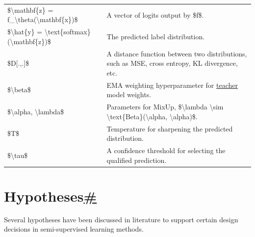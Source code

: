 \begin{longtable}[]{@{}ll@{}}
\$\textbackslash mathbf\{z\} = f\_\textbackslash theta(\textbackslash mathbf\{x\})\$ & A vector of logits output by \$f\$. \\
\$\textbackslash hat\{y\} = \textbackslash text\{softmax\}(\textbackslash mathbf\{z\})\$ & The predicted label distribution. \\
\$D{[}.,.{]}\$ & A distance function between two distributions, such as MSE, cross entropy, KL divergence, etc. \\
\$\textbackslash beta\$ & EMA weighting hyperparameter for \hyperref[mean-teachers]{teacher} model weights. \\
\$\textbackslash alpha, \textbackslash lambda\$ & Parameters for MixUp, \$\textbackslash lambda \textbackslash sim \textbackslash text\{Beta\}(\textbackslash alpha, \textbackslash alpha)\$. \\
\$T\$ & Temperature for sharpening the predicted distribution. \\
\$\textbackslash tau\$ & A confidence threshold for selecting the qualified prediction. \\
\end{longtable}

\section{\texorpdfstring{Hypotheses\hyperref[hypotheses]{\#}}{Hypotheses\#}}\label{hypotheses}

Several hypotheses have been discussed in literature to support certain design decisions in semi-supervised learning methods.


